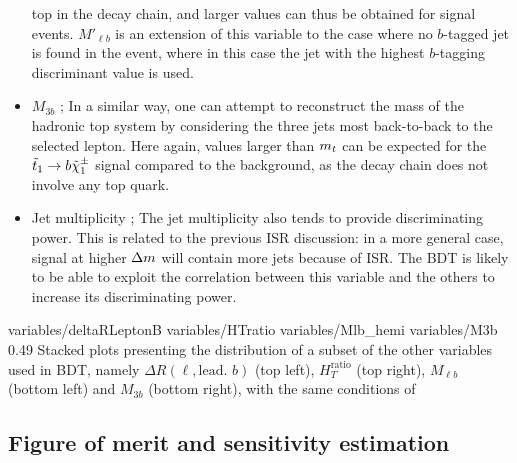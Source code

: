 \begin{itemize}
            top in the decay chain, and larger values can thus be obtained for
            signal events.  $M'_{\ell b}$ is an extension of this variable to
            the case where no $b$-tagged jet is found in the event, where in
            this case the jet with the highest $b$-tagging discriminant value is
            used.
        \item $M_{3b}$ ; In a similar way, one can attempt to reconstruct the
            mass of the hadronic top system by considering the three jets most
            back-to-back to the selected lepton. Here again, values larger than
            $m_{t}$ can be expected for the $\tilde{t}_1 \rightarrow b \tilde{\chi}_1^\pm$
            signal compared to the background, as the decay chain does not
            involve any top quark.
        \item Jet multiplicity ; The jet multiplicity also tends to provide
            discriminating power.  This is related to the previous ISR
            discussion: in a more general case, signal at higher $\Delta m$ will
            contain more jets because of ISR. The BDT is likely to be able to
            exploit the correlation between this variable and the others to
            increase its discriminating power.
    \end{itemize}

                      {variables/deltaRLeptonB}
                      {variables/HTratio}
                      {variables/Mlb_hemi}
                      {variables/M3b}
                      {0.49}
                      {Stacked plots presenting the distribution of a subset of
                      the other variables used in BDT, namely $\Delta R( \ell,
                      \text{lead. } b)$ (top left), $H_{T}^\text{ratio}$ (top
                      right), $M_{\ell b}$ (bottom left) and $M_{3b}$ (bottom
                      right), with the same conditions of
                      }

    \subsection{Figure of merit and sensitivity estimation \label{sec:FoMdiscussion}}


